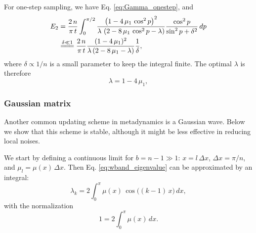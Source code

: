 \documentclass[reprint]{revtex4-1}
\newcommand{\Err}{E}
\begin{document}
For one-step sampling,
we have Eq. \eqref{eq:Gamma_onestep}, and
$$
\begin{aligned}
\Err_2
&=
\frac{   2 \, n }
     { \pi \, t }
\int_0^{\pi/2}
    \frac{          \left(1 - 4 \, \mu_1 \, \cos^2 p \right)^2           }
         { \lambda \, \left(2 - 8 \, \mu_1 \, \cos^2 p - \lambda \right) }
    \frac{ \cos^2 p }
         { \sin^2 p + \delta^2 }
\, dp
\notag \\
&
\stackrel{    \delta \ll 1     }
         { =\joinrel=\joinrel= }
\frac{  2 \, n  }
     { \pi \, t }
\frac{          (1 - 4 \, \mu_1)^2            }
     {  \lambda \, (2 - 8 \, \mu_1 - \lambda) }
\frac{    1   }
     { \delta }
,
\end{aligned}
$$
%
where $\delta \propto 1/n$ is a small parameter to keep the integral finite.
%
The optimal $\lambda$ is therefore
%
\begin{equation}
\lambda = 1 - 4 \, \mu_1,
\label{eq:lambda_tridiag_onestep}
\end{equation}



\subsubsection{Gaussian matrix}



Another common updating scheme
in metadynamics is a Gaussian wave.
%
Below we show that this scheme
is stable, although
it might be less effective
in reducing local noises.



We start by defining
a continuous limit
for $b = n - 1 \gg 1$:
$x = l \, \Delta x$,
$\Delta x = \pi/n$,
and
$\mu_l = \mu(x) \, \Delta x$.
%
Then
Eq. \eqref{eq:wband_eigenvalue}
can be approximated by an integral:
%
\begin{equation}
\lambda_k
=
2 \int_0^\pi
  \mu(x) \, \cos \bigl( (k-1) \, x \bigr) \, dx,
\label{eq:lambda_int}
\end{equation}
%
with the normalization
%
\begin{equation}
1 = 2 \int_0^\pi \mu(x) \, dx.
\label{eq:mx_normalization}
\end{equation}
\end{document}
